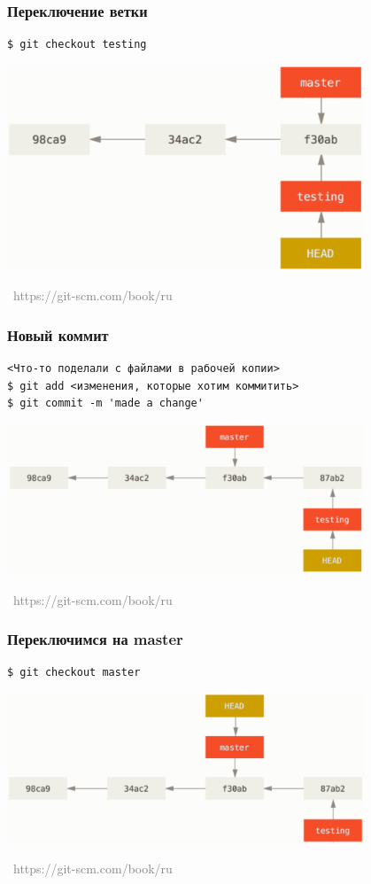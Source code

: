 \documentclass[xetex,mathserif,serif]{beamer}
\newcommand{\attribution}[1] {
	\vspace{-5mm}\begin{flushright}\begin{scriptsize}\textcolor{gray}{\textcopyright\, #1}\end{scriptsize}\end{flushright}
}
\begin{document}
	\begin{frame}[fragile]
		\frametitle{Переключение ветки}
		\begin{verbatim}
$ git checkout testing
		\end{verbatim}
		\begin{center}
			\includegraphics[width=0.8\textwidth]{checkout.png}
			\attribution{https://git-scm.com/book/ru}
		\end{center}
	\end{frame}

	\begin{frame}[fragile]
		\frametitle{Новый коммит}
		\begin{verbatim}
<Что-то поделали с файлами в рабочей копии>
$ git add <изменения, которые хотим коммитить>
$ git commit -m 'made a change'
		\end{verbatim}
		\begin{center}
			\includegraphics[width=0.8\textwidth]{newCommit.png}
			\attribution{https://git-scm.com/book/ru}
		\end{center}
	\end{frame}

	\begin{frame}[fragile]
		\frametitle{Переключимся на master}
		\begin{verbatim}
$ git checkout master
		\end{verbatim}
		\begin{center}
			\includegraphics[width=0.8\textwidth]{checkoutToMaster.png}
			\attribution{https://git-scm.com/book/ru}
		\end{center}
	\end{frame}
\end{document}
